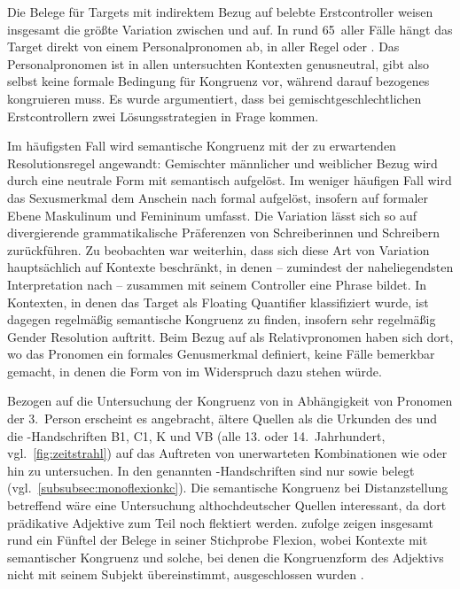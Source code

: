 Die Belege für Targets mit indirektem Bezug auf belebte Erstcontroller weisen
insgesamt die größte Variation zwischen  und  auf. In
rund 65\pct\ aller Fälle hängt das Target direkt von einem Personalpronomen ab,
in aller Regel  oder . Das Personalpronomen ist in allen
untersuchten Kontexten genusneutral, gibt also selbst keine formale Bedingung
für Kongruenz vor, während darauf bezogenes  kongruieren muss.
Es wurde argumentiert, dass bei gemischtgeschlechtlichen Erstcontrollern zwei
Lösungsstrategien in Frage kommen.

Im häufigsten Fall wird semantische Kongruenz mit der zu erwartenden
Resolutionsregel angewandt: Gemischter männlicher und weiblicher Bezug wird
durch eine neutrale Form mit \mbox{} semantisch aufgelöst. Im weniger
häufigen Fall wird das Sexusmerkmal dem Anschein nach formal aufgelöst,
insofern  auf formaler Ebene Maskulinum und Femininum umfasst. Die
Variation lässt sich so auf divergierende grammatikalische Präferenzen von
Schreiberinnen und Schreibern zurück\-führen. Zu beobachten war weiterhin, dass
sich diese Art von Variation hauptsächlich auf Kontexte beschränkt, in denen
 -- zumindest der naheliegendsten Interpretation nach --
zusammen mit seinem Controller eine Phrase bildet. In Kontexten, in denen das
Target als Floating Quantifier klassifiziert wurde, ist dagegen regelmäßig
semantische Kongruenz zu finden, insofern sehr regelmäßig Gender Resolution
auftritt. Beim Bezug auf  als Relativpronomen haben sich dort, wo
das Pronomen ein formales Genusmerkmal definiert, keine Fälle bemerkbar
gemacht, in denen die Form von  im Widerspruch dazu stehen
würde.

Bezogen auf die Untersuchung der Kongruenz von  in Abhängigkeit
von Pro\-nomen der 3.~Person erscheint es angebracht, ältere Quellen als die
Urkunden des \CAO{} und die \KC{}-Handschriften
B1, C1, K und VB (alle 13. oder
14.~Jahrhundert, vgl.~\cref{fig:zeitstrahl}) auf das Auftreten von unerwarteten
Kombinationen wie  oder  hin zu untersuchen.
In den genannten \KC{}-Handschriften sind nur 
sowie  belegt (vgl.~\cref{subsubsec:monoflexionkc}). Die
semantische Kongruenz bei Distanz\-stellung betreffend wäre eine Untersuchung
althochdeutscher Quellen interessant, da dort prädikative Adjektive zum
Teil noch flektiert werden. \citet[310--311]{fleischer2007} zufolge zeigen
insgesamt rund ein Fünftel der Belege in seiner Stichprobe Flexion, wobei
Kontexte mit semantischer Kongruenz und solche, bei denen die Kongruenzform des
Adjektivs nicht mit seinem Subjekt übereinstimmt, ausgeschlossen wurden
\autocite[304]{fleischer2007}.

